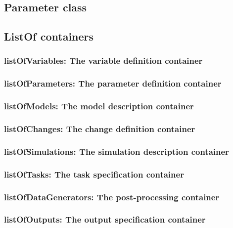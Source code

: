 \subsection{Parameter class}


\newpage
\subsection{ListOf containers}


  \subsubsection{listOfVariables: The variable definition container}
  

  \subsubsection{listOfParameters: The parameter definition container}
  

  \subsubsection{listOfModels: The model description container}
  

  \subsubsection{listOfChanges: The change definition container}
  

  \subsubsection{listOfSimulations: The simulation description container}
  

  \subsubsection{listOfTasks: The task specification container}
  

 \subsubsection{listOfDataGenerators: The post-processing container}
 

 \subsubsection{listOfOutputs: The output specification container}
 


